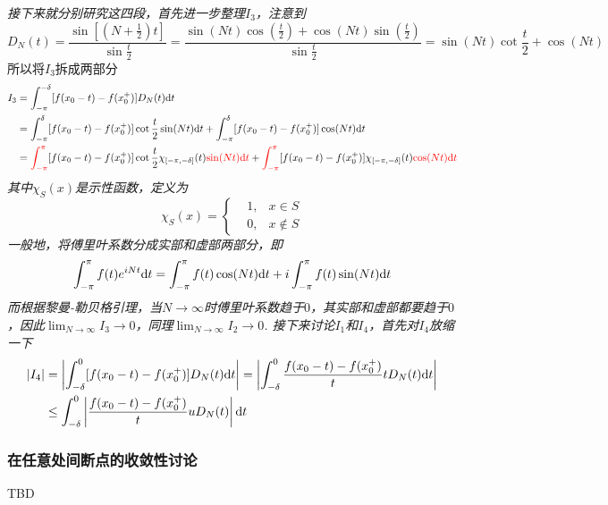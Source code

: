 \textit{接下来就分别研究这四段，首先进一步整理\(I_3\)，注意到}
\[D_N(t) = \frac{\sin[(N+\frac{1}{2})t]}{\sin\frac{t}{2}} = \frac{\sin(Nt)\cos(\frac{t}{2})+\cos(Nt)\sin(\frac{t}{2})}{\sin\frac{t}{2}} = \sin(Nt)\cot\frac{t}{2}+\cos(Nt)\]
所以将\(I_3\)拆成两部分
\begin{align*}
    I_3 &= \int_{-\pi}^{-\delta}[f(x_0-t)-f(x_0^+)]D_N(t){\rm d}t \\
    &= \int_{-\pi}^{\delta}[f(x_0-t)-f(x_0^+)]\cot\frac{t}{2}\sin(Nt){\rm d}t + \int_{-\pi}^{\delta}[f(x_0-t)-f(x_0^+)]\cos(Nt){\rm d}t \\
    &= {\color{red}\int_{-\pi}^{\pi}}[f(x_0-t)-f(x_0^+)]\cot\frac{t}{2}\chi_{[-\pi,-\delta]}(t){\color{red}\sin(Nt){\rm d}t} + {\color{red} \int_{-\pi}^{\pi}}[f(x_0-t)-f(x_0^+)]\chi_{[-\pi,-\delta]}(t){\color{red}\cos(Nt){\rm d}t}
\end{align*}
\textit{其中\(\chi_S(x)\)是示性函数，定义为}
\[\chi_S(x) = \left\{\begin{aligned} & 1, & x \in S \\ & 0, &x \not\in S \end{aligned}\right.\]
\textit{
    一般地，将傅里叶系数分成实部和虚部两部分，即
    \[\int_{-\pi}^{\pi}f(t)e^{iNt}{\rm d}t = \int_{-\pi}^{\pi}f(t)\cos(Nt){\rm d}t + i\int_{-\pi}^{\pi}f(t)\sin(Nt){\rm d}t\]
    而根据黎曼-勒贝格引理，当\(N\to\infty\)时傅里叶系数趋于\(0\)，其实部和虚部都要趋于\(0\)，因此\(\displaystyle{\lim_{N\to\infty}I_3 \to 0}\)，同理\(\displaystyle{\lim_{N\to\infty}I_2 \to 0}\).
    接下来讨论\(I_1\)和\(I_4\)，首先对\(I_4\)放缩一下
}
\begin{align*}
    |I_4| &= \left|\int_{-\delta}^{0}[f(x_0-t)-f(x_0^+)]D_N(t){\rm d}t\right| = \left|\int_{-\delta}^{0}\frac{f(x_0-t)-f(x_0^+)}{t}tD_N(t){\rm d}t\right| \\
        &\leq \int_{-\delta}^{0}\left|\frac{f(x_0-t)-f(x_0^+)}{t}uD_N(t)\right|{\rm d}t
\end{align*}

\subsubsection{在任意处间断点的收敛性讨论}

TBD

